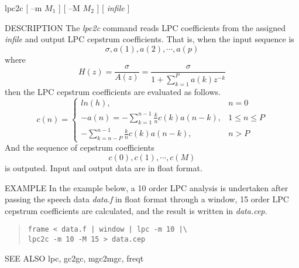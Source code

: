 
\begin{synopsis}
 \item[lpc2c] [ --m $M_1$ ] [ --M $M_2$ ] [ {\em infile} ]
\end{synopsis}
\begin{qsection}{DESCRIPTION}
The {\em lpc2c} command reads LPC coefficients from the assigned
{\em infile} and output LPC cepstrum coefficients.
That is, when the input sequence is 
\[ \sigma, a(1), a(2), \cdots, a(p) \]
where
\[
H(z)=\frac{\sigma}{A(z)}=\frac{\sigma}{\displaystyle 1+\sum_{k=1}^P a(k) z^{-k}}
\]
then the LPC cepstrum coefficients are evaluated as follows.
\[
c(n) =\left\{
\begin{array}{lc}
 ln(h),&n=0\\
\displaystyle -a(n)=-\sum^{n-1}_{k=1}\frac{k}{n}c(k) a(n-k),&1\leq n\leq P\\
\displaystyle -\sum_{k=n-P}^{n-1}\frac{k}{n}c(k) a(n-k),& n>P
\end{array}
\right.
\]
And the sequence of cepstrum coefficients
\[ c(0), c(1), \cdots, c(M) \]
is outputed.
Input and output data are in float format.
\end{qsection}

\begin{options}
\end{options}

\begin{qsection}{EXAMPLE}
In the example below, a 10 order LPC analysis is undertaken after
passing the speech data {\em data.f} in float format through a window,
15 order LPC cepstrum coefficients are calculated,
and the result is written in {\em data.cep}.
\begin{quote}
 \verb!frame < data.f | window | lpc -m 10 |\!\\
 \verb!lpc2c -m 10 -M 15 > data.cep!
\end{quote}
\end{qsection}

\begin{qsection}{SEE ALSO}
lpc, gc2gc, mgc2mgc, freqt
\end{qsection}

